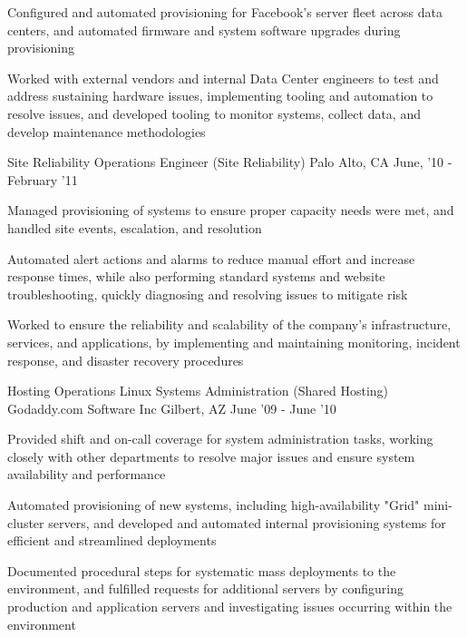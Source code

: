 \begin{cventries}
{\begin{cvitems}
		  \item Configured and automated provisioning for Facebook's server fleet across data centers, and automated firmware and system software upgrades during provisioning
		  \item Worked with external vendors and internal Data Center engineers to test and address sustaining hardware issues, implementing tooling and automation to resolve issues, and developed tooling to monitor systems, collect data, and develop maintenance methodologies
        \end{cvitems}
    }
\vspace{0mm}
\cventry
	{Site Reliability Operations Engineer \color{solarized-orange}(Site Reliability)} %
    {} %
    {Palo Alto, CA} %
    {June, '10 - February '11} %
    {
        \begin{cvitems}
		  \item Managed provisioning of systems to ensure proper capacity needs were met, and handled site events, escalation, and resolution
	      \item Automated alert actions and alarms to reduce manual effort and increase response times, while also performing standard systems and website troubleshooting, quickly diagnosing and resolving issues to mitigate risk
		  \item Worked to ensure the reliability and scalability of the company's infrastructure, services, and applications, by implementing and maintaining monitoring, incident response, and disaster recovery procedures
        \end{cvitems}
    }
\vspace{2mm}
\cventry
	{Hosting Operations Linux Systems Administration \color{solarized-orange}(Shared Hosting)} %
    {Godaddy.com Software Inc} %
    {Gilbert, AZ} %
    {June '09 - June '10} %
    {
        \begin{cvitems}
		  \item Provided shift and on-call coverage for system administration tasks, working closely with other departments to resolve major issues and ensure system availability and performance
		  \item Automated provisioning of new systems, including high-availability "Grid" mini-cluster servers, and developed and automated internal provisioning systems for efficient and streamlined deployments
		  \item Documented procedural steps for systematic mass deployments to the environment, and fulfilled requests for additional servers by configuring production and application servers and investigating issues occurring within the environment

\end{cvitems}}
\end{cventries}
